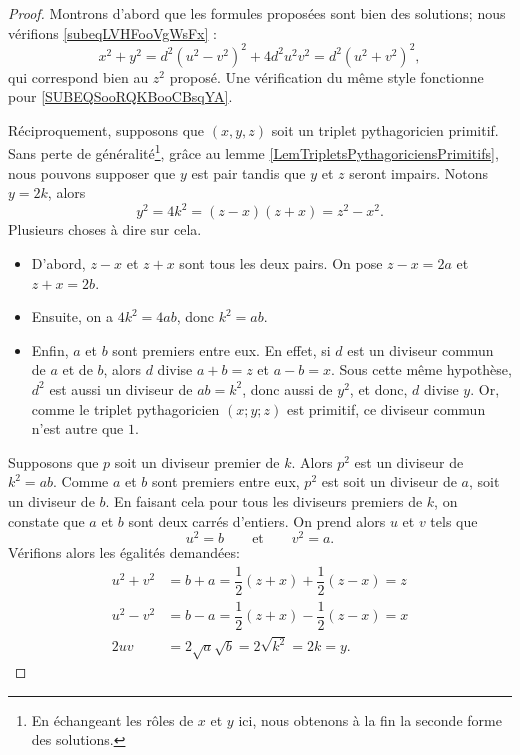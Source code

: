 \begin{proof}
	Montrons d'abord que les formules proposées sont bien des solutions; nous vérifions \eqref{subeqLVHFooVgWsFx} :
	\begin{equation}
		x^2+y^2=d^2(u^2-v^2)^2+4d^2u^2v^2=d^2(u^2+v^2)^2,
	\end{equation}
	qui correspond bien au \( z^2\) proposé. Une vérification du même style fonctionne pour \eqref{SUBEQSooRQKBooCBsqYA}.


	Réciproquement, supposons que $(x,y,z)$ soit un triplet pythagoricien primitif. Sans perte de généralité\footnote{En échangeant les rôles de \( x\) et \( y\) ici, nous obtenons à la fin la seconde forme des solutions.}, grâce au lemme \ref{LemTripletsPythagoriciensPrimitifs}, nous pouvons supposer que \( y\) est pair tandis que \( y\) et \( z\) seront impairs. Notons $y=2k$, alors
	\begin{equation*}
		y^2 = 4k^2 = (z-x)(z+x) = z^2 - x^2.
	\end{equation*}
	Plusieurs choses à dire sur cela.
	\begin{itemize}
		\item D'abord, $z-x$ et $z+x$ sont tous les deux pairs. On pose $z-x = 2a$ et $z+x = 2b$.
		\item Ensuite, on a $4k^2 = 4ab$, donc $k^2 = ab$.
		\item Enfin, \( a\) et \( b\) sont premiers entre eux. En effet, si $d$ est un diviseur commun de $a$ et de $b$, alors $d$ divise $a+b = z$ et $a-b = x$. Sous cette même hypothèse, $d^2$ est aussi un diviseur de $ab = k^2$, donc aussi de $y^2$, et donc, $d$ divise $y$. Or, comme le triplet pythagoricien $(x;y;z)$ est primitif, ce diviseur commun n'est autre que $1$.
	\end{itemize}
	Supposons que $p$ soit un diviseur premier de $k$. Alors $p^2$ est un diviseur de $k^2 = ab$. Comme $a$ et $b$ sont premiers entre eux, $p^2$ est soit un diviseur de $a$, soit un diviseur de $b$. En faisant cela pour tous les diviseurs premiers de $k$, on constate que $a$ et $b$ sont deux carrés d'entiers. On prend alors $u$ et $v$ tels que
	\begin{equation}
		u^2 = b \qquad \text{et} \qquad v^2 = a.
	\end{equation}
	Vérifions alors les égalités demandées:
	\begin{align}
		u^2 + v^2 & = b + a = \dfrac 1 2 (z+x) + \dfrac 1 2  (z - x) = z \\
		u^2 - v^2 & = b - a = \dfrac 1 2 (z+x) - \dfrac 1 2  (z - x) = x \\
		2uv       & = 2\sqrt a\sqrt b = 2\sqrt{k^2} = 2k = y.
	\end{align}
\end{proof}




